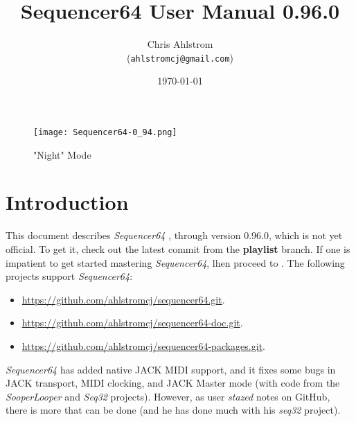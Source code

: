 \documentclass[
 11pt,
 twoside,
 a4paper,
 headinclude,
 footinclude,
 final                                 %
]{article}
\begin{document}
\title{Sequencer64 User Manual 0.96.0}
\author{Chris Ahlstrom \\
   (\texttt{ahlstromcj@gmail.com})}
\date{\today}
\maketitle

\begin{figure}[H]
   \centering 
   \texttt{[image: Sequencer64-0\_94.png]}
   \caption*{"Night" Mode}
\end{figure}

\clearpage                             %

\tableofcontents
\listoffigures                         %
\listoftables                          %


\setlength{\parindent}{2em}
\setlength{\parskip}{1ex plus 0.5ex minus 0.2ex}

\section{Introduction}
\label{sec:introduction}

   This document describes \textsl{Sequencer64}
   \cite{sequencer64}, through version 0.96.0,
   which is not yet official.  To get it, check out
   the latest commit from the \textbf{playlist} branch.
   If one is impatient to get started mastering \textsl{Sequencer64},
   lhen proceed to .
   The following projects support \textsl{Sequencer64}:

   \begin{itemize}
      \item \url{https://github.com/ahlstromcj/sequencer64.git}.
      \item \url{https://github.com/ahlstromcj/sequencer64-doc.git}.
      \item \url{https://github.com/ahlstromcj/sequencer64-packages.git}.
   \end{itemize}

   \textsl{Sequencer64} has added native JACK MIDI support,
   and it fixes some bugs in JACK transport, MIDI clocking, and
   JACK Master mode (with code from the \textsl{SooperLooper} 
   and \textsl{Seq32} projects).
   However, as user \textsl{stazed} notes on GitHub, there is more that can be
   done (and he has done much with his \textsl{seq32} \cite{seq32} project).
\end{document}
